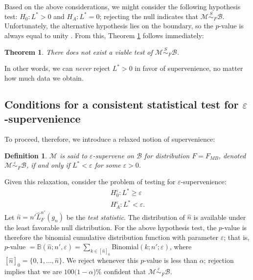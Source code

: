 \documentclass{article}
\newcommand{\mB}{\mathcal{B}}
\newcommand{\mM}{\mathcal{M}}
\newcommand{\eps}{\varepsilon}
\providecommand{\mc}[1]{\mathcal{#1}}
\providecommand{\mh}[1]{\widehat{#1}}
\newcommand{\hL}{\widehat{L}}
\newcommand{\MeB}{\mM \overset{\varepsilon}{{\sim}}_{F} \mB}
\newcommand{\MsB}{\mM \overset{S}{\sim}_{F} \mB}
\newtheorem{defi}{Definition}
\newtheorem{thm}{Theorem}
\begin{document}
Based on the above considerations,
we might consider the following hypothesis test: $H_0: L^*>0$ and $H_A: L^*=0$; rejecting the null indicates that $\MsB$. Unfortunately, 
the alternative hypothesis lies on the boundary, so the $p$-value is always equal to unity \cite{Bickel2000}.  From this, Theorem \ref{thm:2} follows immediately:
\begin{thm} \label{thm:2}
	There does not exist a viable test of $\MsB$.
\end{thm}

In other words, we can \emph{never} reject $L^*>0$ in favor of supervenience, no matter how much data we obtain.  

\subsection*{Conditions for a consistent statistical test for $\eps$-supervenience} %


To proceed, therefore, we introduce a relaxed notion of supervenience: 
\begin{defi}
\label{def:2}
$\mM$ is said to $\eps$-\textit{supervene} on $\mB$ for distribution $F=F_{MB}$, denoted $\MeB$, if and only if $L^*< \eps$ for some $\eps>0$.
\end{defi}
\noindent 
Given this relaxation, consider the problem of testing for $\eps$-supervenience:
\begin{align*}
	H_0^{\eps}: L^* \geq \eps \\
	H_A^{\eps}: L^* < \eps.
\end{align*}
Let $\mh{n}= n' \hL^{n'}_{F}(g_n)$ be the \emph{test statistic}. 
The distribution of $\mh{n}$ is available under the least favorable null distribution. 
For the above hypothesis test,  
the $p$-value is therefore the binomial cumulative distribution function with parameter $\eps$; that is, $p$-value $=\mathbb{B}(\mh{n}; n', \eps)= \sum_{k \in [\mh{n}]_0}$Binomial$(k; n'; \eps)$, where
$[\mh{n}]_0=\{0,1,\ldots, \mh{n}\}$.  We reject whenever this $p$-value is less than $\alpha$; rejection implies that we are $100(1-\alpha$)\% confident that $\MeB$.   
\end{document}
